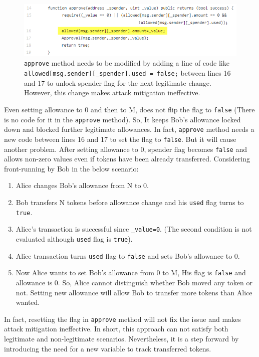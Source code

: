 \begin{figure}[t]
	\centering
	\includegraphics[width=1.0\linewidth]{figures/multiple_withdrawal_33.png}
	\caption{\texttt{approve} method needs to be modified by adding a line of code like \texttt{allowed[msg.sender][\_spender].used = false;} between lines 16 and 17 to unlock spender flag for the next legitimate change. However, this change makes attack mitigation ineffective.\label{fig:det}}
\end{figure}

\noindent Even setting allowance to 0 and then to M, does not flip the flag to \texttt{false} (There is no code for it in the \texttt{approve} method). So, It keeps Bob’s allowance locked down and blocked further legitimate allowances. In fact, \texttt{approve} method needs a new code between lines 16 and 17 to set the flag to \texttt{false}. But it will cause another problem. After setting allowance to 0, spender flag becomes \texttt{false} and allows non-zero values even if tokens have been already transferred. Considering front-running by Bob in the below scenario:
\begin{enumerate}
	\item Alice changes Bob's allowance from N to 0.
	\item Bob transfers N tokens before allowance change and his \texttt{used} flag turns to \texttt{true}.
	\item Alice's transaction is successful since \texttt{\_value=0}. (The second condition is not evaluated although \texttt{used} flag is \texttt{true}).
	\item Alice transaction turns \texttt{used} flag to \texttt{false} and sets Bob's allowance to 0. 
	\item Now Alice wants to set Bob's allowance from 0 to M, His flag is \texttt{false} and allowance is 0. So, Alice cannot distinguish whether Bob moved any token or not. Setting new allowance will allow Bob to transfer more tokens than Alice wanted.
\end{enumerate}
In fact, resetting the flag in \texttt{approve} method will not fix the issue and makes attack mitigation ineffective. In short, this approach can not satisfy both legitimate and non-legitimate scenarios. Nevertheless, it is a step forward by introducing the need for a new variable to track transferred tokens.\newline

